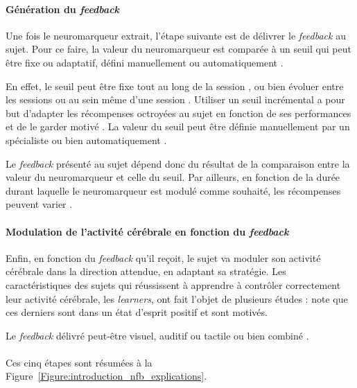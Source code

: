 \paragraph{Génération du \textit{feedback}}
Une fois le neuromarqueur extrait, l'étape suivante est de délivrer le \textit{feedback} au sujet. Pour ce faire, la valeur du neuromarqueur est comparée à un seuil
qui peut être fixe ou adaptatif, défini manuellement ou automatiquement \citep{Arns2014}.

En effet, le seuil peut être fixe tout au long de la session \citep{Kropotov2005, Monastra2002}, ou bien évoluer entre les sessions ou au sein même d'une session \citep{ 
Christiansen2014}. Utiliser un seuil incrémental a pour but d'adapter les récompenses octroyées au sujet en fonction de ses performances et 
de le garder motivé \citep{Bauer2016, Lansbergen2011}. La valeur du seuil peut être définie manuellement par un spécialiste ou bien automatiquement \citep{Arns2014}.

Le \textit{feedback} présenté au sujet dépend donc du résultat de la comparaison entre la valeur du neuromarqueur et celle du seuil. Par ailleurs, en fonction de la durée durant laquelle
le neuromarqueur est modulé comme souhaité, les récompenses peuvent varier \citep{Bioulac2019}. 

\paragraph{Modulation de l'activité cérébrale en fonction du \textit{feedback}}
Enfin, en fonction du \textit{feedback} qu'il reçoit, le sujet va moduler son activité cérébrale dans la direction attendue, en adaptant sa stratégie. 
Les caractéristiques des sujets qui réussissent à apprendre à contrôler correctement leur activité cérébrale, les \textit{learners}, ont fait l'objet de plusieurs études : 
\citet{Friedrich2014} note que ces derniers sont dans un état d'esprit positif et sont motivés. 

Le \textit{feedback} délivré peut-être visuel, auditif ou tactile ou bien combiné \citep{Vernon2004}.
\\
\\
Ces cinq étapes sont résumées à la Figure~\ref{Figure:introduction_nfb_explications}.

